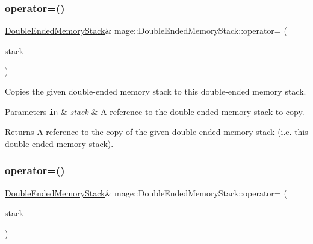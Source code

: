 \subsubsection{\texorpdfstring{operator=()}{operator=()}\hspace{0.1cm}{\footnotesize\ttfamily [1/2]}}
{\footnotesize\ttfamily \hyperlink{classmage_1_1_double_ended_memory_stack}{Double\+Ended\+Memory\+Stack}\& mage\+::\+Double\+Ended\+Memory\+Stack\+::operator= (\begin{DoxyParamCaption}\item[{const \hyperlink{classmage_1_1_double_ended_memory_stack}{Double\+Ended\+Memory\+Stack} \&}]{stack }\end{DoxyParamCaption})\hspace{0.3cm}{\ttfamily [delete]}}

Copies the given double-\/ended memory stack to this double-\/ended memory stack.


\begin{DoxyParams}[1]{Parameters}
\mbox{\tt in}  & {\em stack} & A reference to the double-\/ended memory stack to copy. \\
\hline
\end{DoxyParams}
\begin{DoxyReturn}{Returns}
A reference to the copy of the given double-\/ended memory stack (i.\+e. this double-\/ended memory stack). 
\end{DoxyReturn}
\hypertarget{classmage_1_1_double_ended_memory_stack_a95b220925f1ef732c104901c3f55015d}{}\label{classmage_1_1_double_ended_memory_stack_a95b220925f1ef732c104901c3f55015d} 
\subsubsection{\texorpdfstring{operator=()}{operator=()}\hspace{0.1cm}{\footnotesize\ttfamily [2/2]}}
{\footnotesize\ttfamily \hyperlink{classmage_1_1_double_ended_memory_stack}{Double\+Ended\+Memory\+Stack}\& mage\+::\+Double\+Ended\+Memory\+Stack\+::operator= (\begin{DoxyParamCaption}\item[{\hyperlink{classmage_1_1_double_ended_memory_stack}{Double\+Ended\+Memory\+Stack} \&\&}]{stack }\end{DoxyParamCaption})\hspace{0.3cm}{\ttfamily [delete]}}

